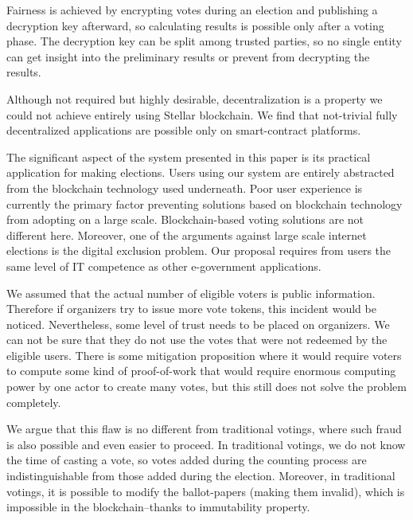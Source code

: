\documentclass[applsci,article,submit,moreauthors,pdftex]{Definitions/mdpi}
\begin{document}
Fairness is achieved by encrypting votes during an election and publishing a decryption key afterward, so calculating results is possible only after a voting phase. The decryption key can be split among trusted parties, so no single entity can get insight into the preliminary results or prevent from decrypting the results.

Although not required but highly desirable, decentralization is a property we could not achieve entirely using Stellar blockchain. We find that not-trivial fully decentralized applications are possible only on smart-contract platforms. 


The significant aspect of the system presented in this paper is its practical application for making elections. Users using our system are entirely abstracted from the blockchain technology used underneath. Poor user experience is currently the primary factor preventing solutions based on blockchain technology from adopting on a large scale. Blockchain-based voting solutions are not different here. Moreover, one of the arguments against large scale internet elections is the digital exclusion problem. Our proposal requires from users the same level of IT competence as other e-government applications.

We assumed that the actual number of eligible voters is public information. Therefore if organizers try to issue more vote tokens, this incident would be noticed. Nevertheless, some level of trust needs to be placed on organizers. We can not be sure that they do not use the votes that were not redeemed by the eligible users. There is some mitigation proposition where it would require voters to compute some kind of proof-of-work that would require enormous computing power by one actor to create many votes, but this still does not solve the problem completely.

We argue that this flaw is no different from traditional votings, where such fraud is also possible and even easier to proceed. In traditional votings, we do not know the time of casting a vote, so votes added during the counting process are indistinguishable from those added during the election. Moreover, in traditional votings, it is possible to modify the ballot-papers (making them invalid), which is impossible in the blockchain–thanks to immutability property.
\end{document}
